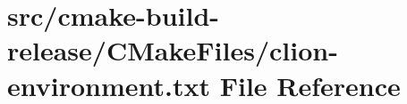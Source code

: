 \hypertarget{cmake-build-release_2CMakeFiles_2clion-environment_8txt}{}\section{src/cmake-\/build-\/release/\+C\+Make\+Files/clion-\/environment.txt File Reference}
\label{cmake-build-release_2CMakeFiles_2clion-environment_8txt}
